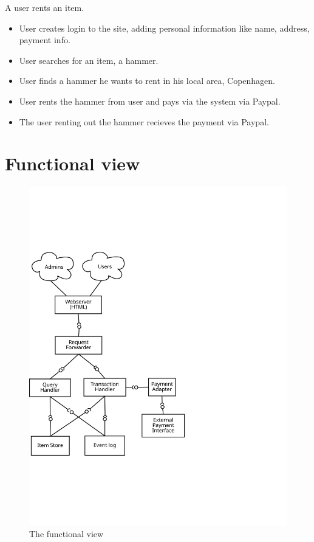 A user rents an item.
\begin{itemize}
  \item User creates login to the site, adding personal information like name, address, payment info.
  \item User searches for an item, a hammer.
  \item User finds a hammer he wants to rent in his local area, Copenhagen.
  \item User rents the hammer from user and pays via the system via Paypal.
  \item The user renting out the hammer recieves the payment via Paypal.
\end{itemize}

\section{Functional view}
\label{sec:functional-view}

\begin{figure}
\label{fig:funcView}
\centering
\caption{The functional view}
\includegraphics[width=\textwidth]{figures/functional-view}
\end{figure}

